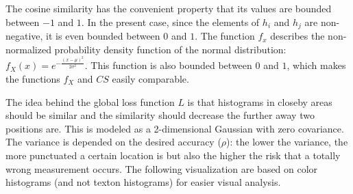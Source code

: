 The cosine similarity has the convenient property that its values are bounded between $-1$ and $1$. In the present case, since the elements of $h_i$ and $h_j$ are non-negative, it is even bounded between $0$ and $1$. The function $f_x$ describes the non-normalized probability density function of the normal distribution: $f_X(x) = e^{- \frac{(x - \mu)^2}{2 \sigma ^ 2}}$. This function is also bounded between $0$ and $1$, which makes the functions $f_X$ and $CS$ easily comparable.

The idea behind the global loss function $L$ is that histograms in closeby areas
should be similar and the similarity should decrease the further away
two positions are. This is modeled as a 2-dimensional Gaussian with zero
covariance. The variance is depended on the
desired accuracy ($\rho$): the lower the variance, the more punctuated
a certain location is but also the higher the risk that a totally
wrong measurement occurs. The following visualization are based on
color histograms (and not texton histograms) for easier visual
analysis.